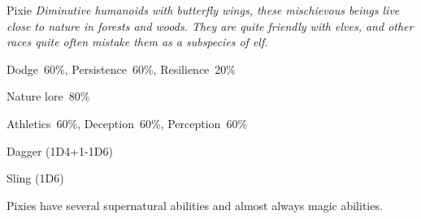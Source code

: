 \begin{monsterbox}{Pixie}
	\textit{Diminutive humanoids with butterfly wings, these mischievous beings live close to nature in forests and woods. They are quite friendly with elves, and other races quite often mistake them as a subspecies of elf.}\\
	\rpghline
	\basics[%
        hitpoints  = 8, 
	majorwound = 4,
	damagemodifier = -1D6,
	powerpoints = 13,
	movementrate = {15m, 30m when flying},
	armor = None,
	plunderrating = 0
	]
	\rpghline%
	\stats[ %
		STR = 2D3  (4),
		CON = 3D6  (11),
		DEX = 4D6  (14),
		SIZ = 1D6  (4),
		INT = 3D6   (11),
		POW = 2D6+6 (13),
		CHA = 3D6   (11)
	]
	\rpghline%
	\begin{rpg-monsteraction}[Resistances]
		Dodge~60\%, Persistence~60\%, Resilience~20\%
	\end{rpg-monsteraction}
	\begin{rpg-monsteraction}[Knowledge]
    		Nature lore~80\%
	\end{rpg-monsteraction}
	\begin{rpg-monsteraction}[Practical]
		Athletics~60\%, Deception~60\%, Perception~60\%
	\end{rpg-monsteraction}
	\begin{rpg-monsteraction}
		Dagger (1D4+1-1D6)
	\end{rpg-monsteraction}
	\begin{rpg-monsteraction}
		Sling (1D6)
	\end{rpg-monsteraction}
	\begin{rpg-monsteraction}[Supernatural]
		Pixies have several supernatural abilities and almost always magic abilities.
	\end{rpg-monsteraction}


\end{monsterbox}

\newpage

